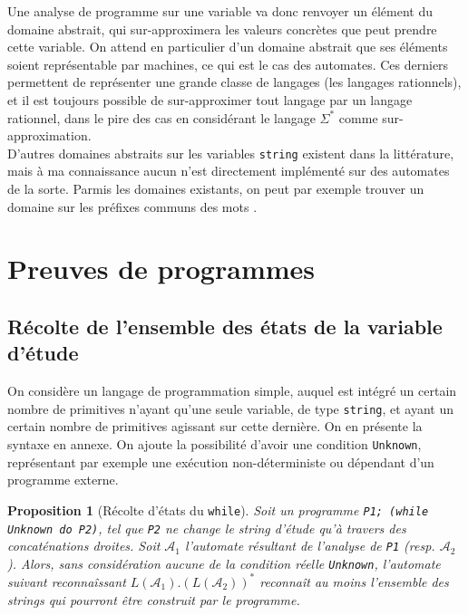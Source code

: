 \documentclass{article}
\newtheorem{proposition}{Proposition}
\begin{document}
Une analyse de programme sur une variable va donc renvoyer un élément du domaine abstrait, qui
sur-approximera les valeurs concrètes que peut prendre cette variable.
On attend en particulier d'un domaine abstrait que ses éléments soient représentable par machines,
ce qui est le cas des automates. Ces derniers permettent de représenter une grande classe de langages
(les langages rationnels), et il est toujours possible de sur-approximer tout langage par un langage rationnel,
dans le pire des cas en considérant le langage $\Sigma^*$ comme sur-approximation. \\
D'autres domaines abstraits sur les variables \texttt{string} existent dans la littérature, mais
à ma connaissance aucun n'est directement implémenté sur des automates de la sorte.
Parmis les domaines existants, on peut par exemple trouver un domaine sur les préfixes communs des mots \cite{string_analysis}. %


\section{Preuves de programmes}
\subsection{Récolte de l'ensemble des états de la variable d'étude}

On considère un langage de programmation simple, auquel est intégré un certain nombre de primitives
n'ayant qu'une seule variable, de type \texttt{string}, et ayant un certain nombre de primitives agissant sur cette dernière.
On en présente la syntaxe en annexe. On ajoute la possibilité d'avoir une condition
\texttt{Unknown}, représentant par exemple une exécution non-déterministe ou dépendant d'un programme externe.





\begin{proposition}[Récolte d'états du \texttt{while}]
    Soit un programme \texttt{P1; (while Unknown do P2)}, tel que \texttt{P2} ne change le string d'étude qu'à travers
    des concaténations droites. Soit $\mathcal{A}_1$ l'automate résultant de l'analyse de \texttt{P1} (resp. $\mathcal{A}_2$).
    Alors, sans considération aucune de la condition réelle \texttt{Unknown}, l'automate suivant reconnaîssant
    $L(\mathcal{A}_1) . (L(\mathcal{A}_2)) ^*$ reconnaît \emph{au moins} l'ensemble des strings qui pourront être construit
    par le programme.
\end{proposition}
\end{document}
